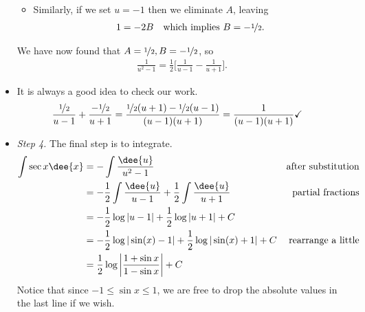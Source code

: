 \begin{eg}
\begin{itemize}
\begin{itemize}
\item Similarly, if we set $u=-1$ then we eliminate $A$, leaving
\begin{align*}
  1 &= -2B & \text{which implies $B=-\nicefrac{1}{2}$.}
\end{align*}

\end{itemize}
We have now found that $A=\nicefrac{1}{2}, B=-\nicefrac{1}{2}$, so
\begin{align*}
\frac{1}{u^2-1}
=\frac{1}{2}\Big[\frac{1}{u-1}-\frac{1}{u+1}\Big].
\end{align*}
\item It is always a good idea to check our work.
\begin{align*}
\frac{\nicefrac{1}{2}}{u-1}+\frac{-\nicefrac{1}{2}}{u+1}
&=\frac{\nicefrac{1}{2}(u+1)-\nicefrac{1}{2}(u-1)}{(u-1)(u+1)}
=\frac{1}{(u-1)(u+1)} \checkmark
\end{align*}

\item \emph{Step 4.}
 The final step is to integrate.
\begin{align*}
\int \sec x\dee{x}
  &= -\int \frac{\dee{u}}{u^2-1} & \text{after substitution}\\
  & =-\frac{1}{2}\int \frac{\dee{u}}{u-1} +\frac{1}{2}\int \frac{\dee{u}}{u+1}
& \text{partial fractions}\\
  & =-\frac{1}{2}\log|u-1|+\frac{1}{2}\log|u+1|+C \\
  & =-\frac{1}{2}\log|\sin(x)-1|+\frac{1}{2}\log|\sin(x)+1|+C & \text{rearrange a
little}\\
  & =\frac{1}{2}\log\left|\frac{1+\sin x}{1-\sin x}\right|+C
\end{align*}
Notice that since $-1\le\sin x\le 1$, we are free to drop the absolute values in the last
line if we wish.
\end{itemize}
\end{eg}

